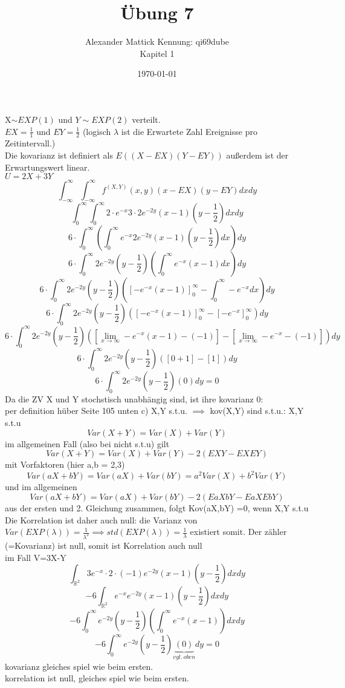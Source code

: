 \documentclass{article}
\author{
Alexander Mattick Kennung: qi69dube\\
Kapitel 1
}
\date{\today}
\title{Übung 7}
\begin{document}
	\maketitle
	X$\sim EXP(1)$ und $Y\sim EXP(2)$ verteilt.\\
	$EX = \frac{1}{1}$ und $EY = \frac{1}{2}$ (logisch $\lambda$ ist die Erwartete Zahl Ereignisse pro Zeitintervall.)\\
	Die kovarianz ist definiert als $E((X-EX)(Y-EY))$ außerdem ist der Erwartungswert linear.\\
	$U=2X+3Y$\\
	\[\int_{-\infty}^\infty\int_{-\infty}^\infty f^{(X,Y)}(x,y)(x-EX)(y-EY)dxdy\]
	\[\int_{0}^\infty\int_{0}^\infty 2\cdot e^{-x}3\cdot 2e^{-2y}(x-1)(y-\frac{1}{2})dxdy\]
	\[6\cdot\int_{0}^\infty(\int_{0}^\infty e^{-x}2e^{-2y}(x-1)(y-\frac{1}{2})dx)dy\]
	\[6\cdot\int_{0}^\infty 2e^{-2y}(y-\frac{1}{2})(\int_{0}^\infty e^{-x}(x-1)dx)dy\]
	\[6\cdot\int_{0}^\infty 2e^{-2y}(y-\frac{1}{2})([-e^{-x}(x-1)]_0^\infty-\int_{0}^\infty -e^{-x}dx)dy\]
	\[6\cdot\int_{0}^\infty 2e^{-2y}(y-\frac{1}{2})([-e^{-x}(x-1)]_0^\infty-[ -e^{-x}]_{0}^\infty)dy\]
	\[6\cdot\int_{0}^\infty 2e^{-2y}(y-\frac{1}{2})([\lim_{x\to\infty}-e^{-x}(x-1)-(-1)]-[\lim_{x\to\infty} -e^{-x}-(-1)])dy\]
	\[6\cdot\int_{0}^\infty 2e^{-2y}(y-\frac{1}{2})([0+1]-[1])dy\]
	\[6\cdot\int_{0}^\infty 2e^{-2y}(y-\frac{1}{2})(0)dy=0\]
	Da die ZV X und Y stochstisch unabhängig sind, ist ihre kovarianz 0:\\
	per definition hüber Seite 105 unten c) X,Y s.t.u. $\implies$ kov(X,Y) sind s.t.u.: X,Y s.t.u\\
	\[Var(X+Y) =Var(X)+Var(Y)\]
	im allgemeinen Fall (also bei nicht s.t.u) gilt
	\[Var(X+Y) = Var(X)+Var(Y)-2(EXY-EXEY)\]
	mit Vorfaktoren (hier a,b = 2,3)
	\[Var(aX+bY) =Var(aX)+Var(bY) =a^2Var(X)+b^2Var(Y)\]
	und im allgemeinen
	\[Var(aX+bY) = Var(aX)+Var(bY)-2(EaXbY-EaXEbY)\]
	aus der ersten und 2. Gleichung zusammen, folgt Kov(aX,bY) =0, wenn X,Y s.t.u\\
	Die Korrelation ist daher auch null: die Varianz von $Var(EXP(\lambda))=\frac{1}{\lambda^2}\implies std(EXP(\lambda))=\frac{1}{\lambda}$ existiert somit. Der zähler (=Kovarianz) ist null, somit ist Korrelation auch null\\
	im Fall V=3X-Y\\
	\[\int_{\mathbb{R}^2}3e^{-x}\cdot 2\cdot(-1)e^{-2y}(x-1)(y-\frac{1}{2})dxdy\]
	\[-6\int_{\mathbb{R}^2}e^{-x}e^{-2y}(x-1)(y-\frac{1}{2})dxdy\]
	\[-6\int_{0}^\infty e^{-2y}(y-\frac{1}{2})(\int_{0}^\infty e^{-x}(x-1))dxdy\]
	\[-6\int_{0}^\infty e^{-2y}(y-\frac{1}{2})\underbrace{(0)}_{vgl.\ oben}dy=0\]
	kovarianz gleiches spiel wie beim ersten.\\
	korrelation ist null, gleiches spiel wie beim ersten.\\
\end{document}
